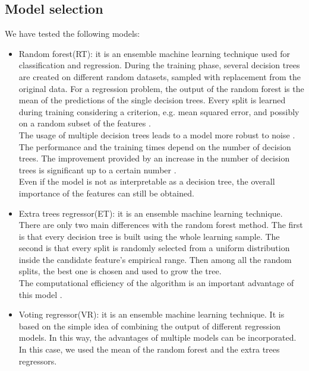 \documentclass[conference]{IEEEtran}
\begin{document}
\subsection{Model selection}
We have tested the following models:
\begin{itemize}
    \item Random forest(RT): it is an ensemble machine learning technique used for classification and regression. During the training phase, several decision trees are created on different random datasets, sampled with replacement from the original data. For a regression problem, the output of the random forest is the mean of the predictions of the single decision trees. Every split is learned during training considering a criterion, e.g. mean squared error, and possibly on a random subset of the features \cite{randomForest} \cite{extraTree}.\\
The usage of multiple decision trees leads to a model more robust to noise \cite{randomForest}. The performance and the training times depend on the number of decision trees. The improvement provided by an increase in the number of decision trees is significant up to a certain number \cite{limitNumTrees}.\\
Even if the model is not as interpretable as a decision tree, the overall importance of the features can still be obtained.
\item Extra trees regressor(ET): it is an ensemble machine learning technique. There are only two main differences with the random forest method. The first is that every decision tree is built using the whole learning sample. The second is that every split is randomly selected from a uniform distribution inside the candidate feature's empirical range. Then among all the random splits, the best one is chosen and used to grow the tree. \\
The computational efficiency of the algorithm is an important advantage of this model \cite{extraTree}.
\item Voting regressor(VR): it is an ensemble machine learning technique. It is based on the simple idea of combining the output of different regression models. In this way, the advantages of multiple models can be incorporated. In this case, we used the mean of the random forest and the extra trees regressors. %
\end{itemize}
\end{document}
